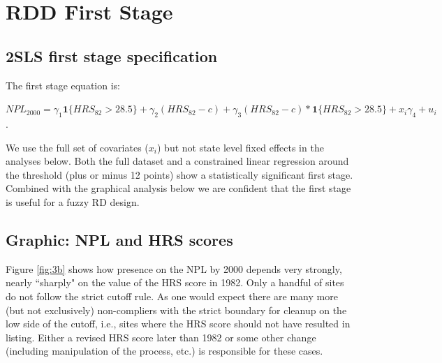 \documentclass[letterpaper, 12pt]{article}
\newcommand{\ind}[1]{\textbf{1}\{#1\}}
\begin{document}
\section{RDD First Stage}


\subsection{2SLS first stage specification}
The first stage equation is:

 $NPL_{2000}=\gamma_1\ind{HRS_{82} > 28.5} +\gamma_2(HRS_{82}-c) + \gamma_3(HRS_{82}-c)*\ind{HRS_{82} > 28.5}+x_i\gamma_4+u_i$.
 
 We use the full set of covariates ($x_i$) but not state level fixed effects in the analyses below.  Both the full dataset and a constrained linear regression around the threshold (plus or minus 12 points) show a statistically significant first stage.  Combined with the graphical analysis below we are confident that the first stage is useful for a fuzzy RD design.  

\subsection{Graphic: NPL and HRS scores}

Figure \ref{fig:3b} shows how presence on the NPL by 2000 depends very strongly, nearly ``sharply" on the value of the HRS score in 1982.  Only a handful of sites do not follow the strict cutoff rule.  As one would expect there are many more (but not exclusively) non-compliers with the strict boundary for cleanup on the low side of the cutoff, i.e., sites where the HRS score should not have resulted in listing.  Either a revised HRS score later than 1982 or some other change (including manipulation of the process, etc.) is responsible for these cases.  
\end{document}
